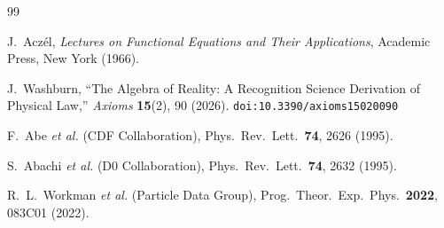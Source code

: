 \documentclass[12pt,a4paper]{article}
\theoremstyle{definition}
\theoremstyle{remark}
\begin{document}
\begin{thebibliography}{99}

J.~Acz\'el, \emph{Lectures on Functional Equations and Their Applications},
Academic Press, New York (1966).

J.~Washburn, ``The Algebra of Reality: A Recognition Science Derivation
of Physical Law,'' \emph{Axioms} \textbf{15}(2), 90 (2026).
\texttt{doi:10.3390/axioms15020090}

F.~Abe \textit{et al.} (CDF Collaboration), Phys.\ Rev.\ Lett.\
\textbf{74}, 2626 (1995).

S.~Abachi \textit{et al.} (D0 Collaboration), Phys.\ Rev.\ Lett.\
\textbf{74}, 2632 (1995).

R.~L.~Workman \textit{et al.} (Particle Data Group), Prog.\ Theor.\
Exp.\ Phys.\ \textbf{2022}, 083C01 (2022).

\end{thebibliography}
\end{document}
